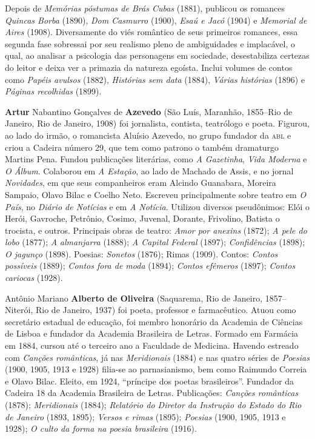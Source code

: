 Depois de \emph{Memórias póstumas de Brás Cubas} (1881), publicou os
romances \emph{Quincas Borba} (1890), \emph{Dom Casmurro} (1900),
\emph{Esaú e Jacó} (1904) e \emph{Memorial de Aires} (1908).
Diversamente do viés romântico de seus primeiros romances, essa segunda
fase sobressai por seu realismo pleno de ambiguidades e implacável, o
qual, ao analisar a psicologia das personagens em sociedade,
desestabiliza certezas do leitor e deixa ver a primazia da natureza
egoísta. Inclui volumes de contos como \emph{Papéis avulsos} (1882),
\emph{Histórias sem data} (1884), \emph{Várias histórias} (1896) e
\emph{Páginas recolhidas} (1899).

\textbf{Artur} Nabantino Gonçalves de \textbf{Azevedo} (São Luís,
Maranhão, 1855--Rio de Janeiro, Rio de Janeiro, 1908) foi jornalista,
contista, teatrólogo e poeta. Figurou, ao lado do irmão, o romancista
Aluísio Azevedo, no grupo fundador da \textsc{abl} e criou a Cadeira número 29,
que tem como patrono o também dramaturgo Martins Pena. Fundou
publicações literárias, como \emph{A Gazetinha}, \emph{Vida Moderna} e
\emph{O Álbum}. Colaborou em \emph{A Estação}, ao lado de Machado de
Assis, e no jornal \emph{Novidades}, em que seus companheiros eram
Alcindo Guanabara, Moreira Sampaio, Olavo Bilac e Coelho Neto. Escreveu
principalmente sobre teatro em \emph{O País}, no \emph{Diário de
Notícias} e em \emph{A Notícia}. Utilizou diversos pseudônimos: Elói o
Herói, Gavroche, Petrônio, Cosimo, Juvenal, Dorante, Frivolino, Batista
o trocista, e outros. Principais obras de teatro: \emph{Amor por
anexins} (1872); \emph{A pele do lobo} (1877); \emph{A}
\emph{almanjarra} (1888); \emph{A Capital Federal} (1897);
\emph{Confidências} (1898); \emph{O jagunço} (1898). Poesias:
\emph{Sonetos} (1876); Rimas (1909). Contos: \emph{Contos possíveis}
(1889); \emph{Contos fora de moda} (1894); \emph{Contos efêmeros}
(1897); \emph{Contos cariocas} (1928).

Antônio Mariano \textbf{Alberto de Oliveira}
(Saquarema, Rio de Janeiro, 1857--Niterói, Rio de Janeiro,
1937) foi poeta, professor e farmacêutico. Atuou como secretário
estadual de educação, foi membro honorário da Academia de Ciências de
Lisboa e fundador da Academia Brasileira de Letras. Formado em Farmácia
em 1884, cursou até o terceiro ano a Faculdade de Medicina. Havendo
estreado com \emph{Canções românticas}, já nas \emph{Meridionais} (1884)
e nas quatro séries de \emph{Poesias} (1900, 1905, 1913 e 1928) filia-se
ao parnasianismo, bem como Raimundo Correia e Olavo Bilac. Eleito, em
1924, ``príncipe dos poetas brasileiros''. Fundador da Cadeira 18 da
Academia Brasileira de Letras. Publicações: \emph{Canções românticas}
(1878); \emph{Meridionais} (1884); \emph{Relatório do Diretor da
Instrução do Estado do Rio de Janeiro} (1893, 1895); \emph{Versos e
rimas} (1895); \emph{Poesias} (1900, 1905, 1913 e 1928); \emph{O culto
da forma na poesia brasileira} (1916).

